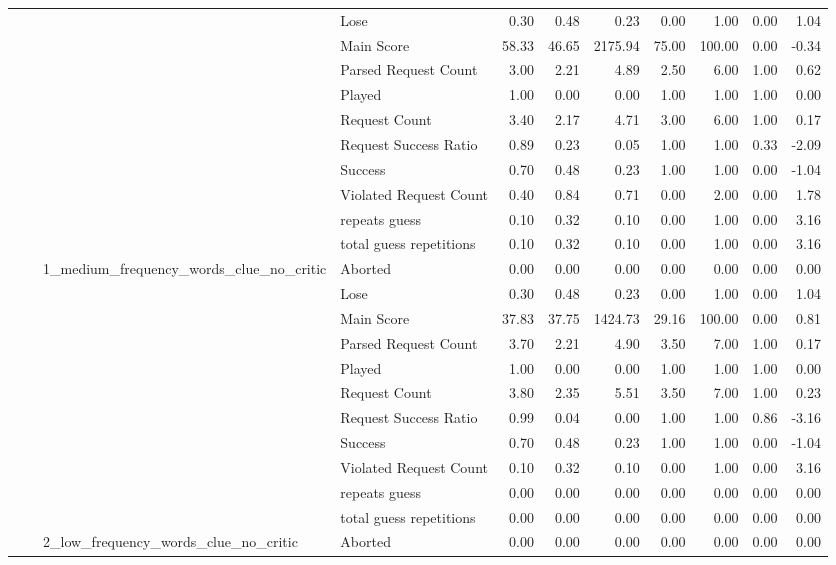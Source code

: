 \begin{tabular}{llllrrrrrrr}
 &  &  & Lose & 0.30 & 0.48 & 0.23 & 0.00 & 1.00 & 0.00 & 1.04 \\
 &  &  & Main Score & 58.33 & 46.65 & 2175.94 & 75.00 & 100.00 & 0.00 & -0.34 \\
 &  &  & Parsed Request Count & 3.00 & 2.21 & 4.89 & 2.50 & 6.00 & 1.00 & 0.62 \\
 &  &  & Played & 1.00 & 0.00 & 0.00 & 1.00 & 1.00 & 1.00 & 0.00 \\
 &  &  & Request Count & 3.40 & 2.17 & 4.71 & 3.00 & 6.00 & 1.00 & 0.17 \\
 &  &  & Request Success Ratio & 0.89 & 0.23 & 0.05 & 1.00 & 1.00 & 0.33 & -2.09 \\
 &  &  & Success & 0.70 & 0.48 & 0.23 & 1.00 & 1.00 & 0.00 & -1.04 \\
 &  &  & Violated Request Count & 0.40 & 0.84 & 0.71 & 0.00 & 2.00 & 0.00 & 1.78 \\
 &  &  & repeats guess & 0.10 & 0.32 & 0.10 & 0.00 & 1.00 & 0.00 & 3.16 \\
 &  &  & total guess repetitions & 0.10 & 0.32 & 0.10 & 0.00 & 1.00 & 0.00 & 3.16 \\
\cline{3-11}
 &  & \multirow[t]{11}{*}{1_medium_frequency_words_clue_no_critic} & Aborted & 0.00 & 0.00 & 0.00 & 0.00 & 0.00 & 0.00 & 0.00 \\
 &  &  & Lose & 0.30 & 0.48 & 0.23 & 0.00 & 1.00 & 0.00 & 1.04 \\
 &  &  & Main Score & 37.83 & 37.75 & 1424.73 & 29.16 & 100.00 & 0.00 & 0.81 \\
 &  &  & Parsed Request Count & 3.70 & 2.21 & 4.90 & 3.50 & 7.00 & 1.00 & 0.17 \\
 &  &  & Played & 1.00 & 0.00 & 0.00 & 1.00 & 1.00 & 1.00 & 0.00 \\
 &  &  & Request Count & 3.80 & 2.35 & 5.51 & 3.50 & 7.00 & 1.00 & 0.23 \\
 &  &  & Request Success Ratio & 0.99 & 0.04 & 0.00 & 1.00 & 1.00 & 0.86 & -3.16 \\
 &  &  & Success & 0.70 & 0.48 & 0.23 & 1.00 & 1.00 & 0.00 & -1.04 \\
 &  &  & Violated Request Count & 0.10 & 0.32 & 0.10 & 0.00 & 1.00 & 0.00 & 3.16 \\
 &  &  & repeats guess & 0.00 & 0.00 & 0.00 & 0.00 & 0.00 & 0.00 & 0.00 \\
 &  &  & total guess repetitions & 0.00 & 0.00 & 0.00 & 0.00 & 0.00 & 0.00 & 0.00 \\
\cline{3-11}
 &  & \multirow[t]{11}{*}{2_low_frequency_words_clue_no_critic} & Aborted & 0.00 & 0.00 & 0.00 & 0.00 & 0.00 & 0.00 & 0.00 \\

\end{tabular}
